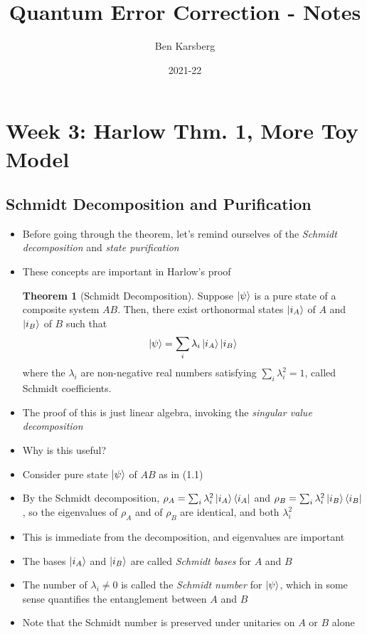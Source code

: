 \documentclass[12pt,a4paper]{article}
\title{Quantum Error Correction - Notes}
\author{Ben Karsberg}
\date{2021-22}
\numberwithin{equation}{section}
\newcommand{\ketbra}[2]{\ket{#1}\bra{#2}}
\newcommand{\ketbras}[1]{\ketbra{#1}{#1}}
\theoremstyle{definition}
\theoremstyle{theorem}
\newtheorem{theorem}{Theorem}[section]
\theoremstyle{example}
\begin{document}
	\maketitle
	\section{Week 3: Harlow Thm. 1, More Toy Model}
	\subsection{Schmidt Decomposition and Purification}
	\begin{itemize}
		\item Before going through the theorem, let's remind ourselves of the \textit{Schmidt decomposition} and \textit{state purification}
		\item These concepts are important in Harlow's proof
		\begin{theorem}[Schmidt Decomposition]
			Suppose $\ket{\psi}$ is a pure state of a composite system $AB$. Then, there exist orthonormal states $\ket{i_{A}}$ of $A$ and $\ket{i_{B}}$ of $B$ such that
			\begin{equation}
				\ket{\psi}=\sum_{i}\lambda_{i}\ket{i_{A}}\ket{i_{B}}
			\end{equation}
			where the $\lambda_{i}$ are non-negative real numbers satisfying $\sum_{i}\lambda^{2}_{i}=1$, called Schmidt coefficients.
		\end{theorem}
		\item The proof of this is just linear algebra, invoking the \textit{singular value decomposition}
		\item Why is this useful?
		\item Consider pure state $\ket{\psi}$ of $AB$ as in (1.1)
		\item By the Schmidt decomposition, $\rho_{A}=\sum_{i}\lambda_{i}^{2}\ketbras{i_{A}}$ and $\rho_{B}=\sum_{i}\lambda_{i}^{2}\ketbras{i_{B}}$, so the eigenvalues of $\rho_{A}$ and of $\rho_{B}$ are identical, and both $\lambda_{i}^{2}$
		\item This is immediate from the decomposition, and eigenvalues are important
		\item The bases $\ket{i_{A}}$ and $\ket{i_{B}}$ are called \textit{Schmidt bases} for $A$ and $B$
		\item The number of $\lambda_{i}\neq 0$ is called the \textit{Schmidt number} for $\ket{\psi}$, which in some sense quantifies the entanglement between $A$ and $B$
		\item Note that the Schmidt number is preserved under unitaries on $A$ or $B$ alone

\end{itemize}
\end{document}
